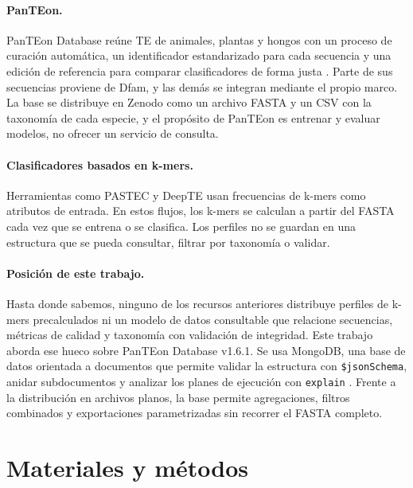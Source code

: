 \documentclass[pdflatex,lineno,referee,sn-vancouver-num]{sn-jnl}
\theoremstyle{thmstyleone}%
\theoremstyle{thmstyletwo}%
\theoremstyle{thmstylethree}%
\begin{document}
\paragraph{PanTEon.} PanTEon Database reúne TE de animales, plantas y hongos con un proceso de curación automática, un identificador estandarizado para cada secuencia y una edición de referencia para comparar clasificadores de forma justa \cite{orozco2026panteon,orozco2026panteondb}. Parte de sus secuencias proviene de Dfam, y las demás se integran mediante el propio marco. La base se distribuye en Zenodo como un archivo FASTA y un CSV con la taxonomía de cada especie, y el propósito de PanTEon es entrenar y evaluar modelos, no ofrecer un servicio de consulta.

\paragraph{Clasificadores basados en k-mers.} Herramientas como PASTEC \cite{hoede2014pastec} y DeepTE \cite{yan2020deepte} usan frecuencias de k-mers como atributos de entrada. En estos flujos, los k-mers se calculan a partir del FASTA cada vez que se entrena o se clasifica. Los perfiles no se guardan en una estructura que se pueda consultar, filtrar por taxonomía o validar.

\paragraph{Posición de este trabajo.} Hasta donde sabemos, ninguno de los recursos anteriores distribuye perfiles de k-mers precalculados ni un modelo de datos consultable que relacione secuencias, métricas de calidad y taxonomía con validación de integridad. Este trabajo aborda ese hueco sobre PanTEon Database v1.6.1. Se usa MongoDB, una base de datos orientada a documentos que permite validar la estructura con \texttt{\$jsonSchema}, anidar subdocumentos y analizar los planes de ejecución con \texttt{explain} \cite{mongodb2026docs}. Frente a la distribución en archivos planos, la base permite agregaciones, filtros combinados y exportaciones parametrizadas sin recorrer el FASTA completo.

\section{Materiales y métodos}\label{sec:metodos}

\begingroup
\sloppy %
\end{document}
